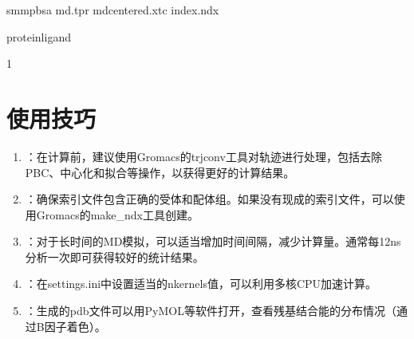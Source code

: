 \documentclass[letterpaper,10pt,english]{sphinxmanual}
\begin{document}
\begin{sphinxVerbatim}[commandchars=\\\{\}]
s\PYGZus{}mmpbsa
md.tpr
md\PYGZus{}centered.xtc
index.ndx



protein\PYGZus{}ligand

\PYGZhy{}1
\end{sphinxVerbatim}


\section{使用技巧}
\label{\detokenize{quick_start:id9}}\begin{enumerate}
%
\item {} 
\sphinxAtStartPar
{}：在计算前，建议使用Gromacs的trjconv工具对轨迹进行处理，包括去除PBC、中心化和拟合等操作，以获得更好的计算结果。

\item {} 
\sphinxAtStartPar
{}：确保索引文件包含正确的受体和配体组。如果没有现成的索引文件，可以使用Gromacs的make\_ndx工具创建。

\item {} 
\sphinxAtStartPar
{}：对于长时间的MD模拟，可以适当增加时间间隔，减少计算量。通常每1\sphinxhyphen{}2ns分析一次即可获得较好的统计结果。

\item {} 
\sphinxAtStartPar
{}：在settings.ini中设置适当的nkernels值，可以利用多核CPU加速计算。

\item {} 
\sphinxAtStartPar
{}：生成的pdb文件可以用PyMOL等软件打开，查看残基结合能的分布情况（通过B因子着色）。

\end{enumerate}
\end{document}
